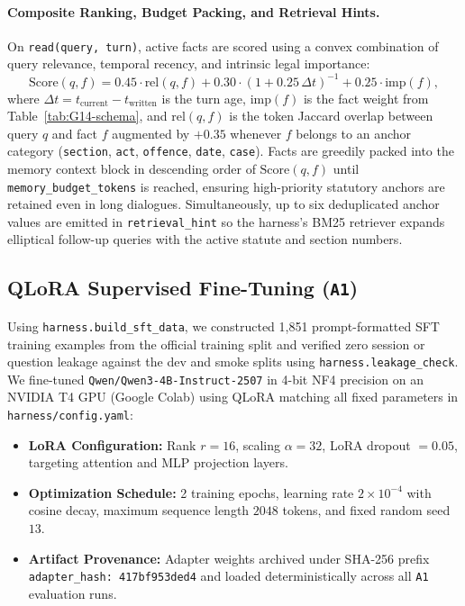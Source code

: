 \documentclass[11pt]{article}
\newcommand{\groupid}{G14}
\begin{document}
\paragraph{Composite Ranking, Budget Packing, and Retrieval Hints.}
On \texttt{read(query, turn)}, active facts are scored using a convex combination of query relevance, temporal recency, and intrinsic legal importance:
\begin{equation}
\text{Score}(q, f) = 0.45 \cdot \text{rel}(q, f) + 0.30 \cdot (1 + 0.25\,\Delta t)^{-1} + 0.25 \cdot \text{imp}(f),
\label{eq:\groupid-score}
\end{equation}
where $\Delta t = t_{\text{current}} - t_{\text{written}}$ is the turn age, $\text{imp}(f)$ is the fact weight from Table~\ref{tab:\groupid-schema}, and $\text{rel}(q, f)$ is the token Jaccard overlap between query $q$ and fact $f$ augmented by $+0.35$ whenever $f$ belongs to an anchor category (\texttt{section}, \texttt{act}, \texttt{offence}, \texttt{date}, \texttt{case}). Facts are greedily packed into the memory context block in descending order of $\text{Score}(q, f)$ until \texttt{memory\_budget\_tokens} is reached, ensuring high-priority statutory anchors are retained even in long dialogues. Simultaneously, up to six deduplicated anchor values are emitted in \texttt{retrieval\_hint} so the harness's BM25 retriever expands elliptical follow-up queries with the active statute and section numbers.

\subsection{QLoRA Supervised Fine-Tuning (\texttt{A1})}
Using \texttt{harness.build\_sft\_data}, we constructed 1,851 prompt-formatted SFT training examples from the official training split and verified zero session or question leakage against the dev and smoke splits using \texttt{harness.leakage\_check}. We fine-tuned \texttt{Qwen/Qwen3-4B-Instruct-2507} in 4-bit NF4 precision on an NVIDIA T4 GPU (Google Colab) using QLoRA matching all fixed parameters in \texttt{harness/config.yaml}:
\begin{itemize}[leftmargin=*,nosep]
    \item \textbf{LoRA Configuration:} Rank $r = 16$, scaling $\alpha = 32$, LoRA dropout $= 0.05$, targeting attention and MLP projection layers.
    \item \textbf{Optimization Schedule:} 2 training epochs, learning rate $2 \times 10^{-4}$ with cosine decay, maximum sequence length $2048$ tokens, and fixed random seed $13$.
    \item \textbf{Artifact Provenance:} Adapter weights archived under SHA-256 prefix \texttt{adapter\_hash: 417bf953ded4} and loaded deterministically across all \texttt{A1} evaluation runs.
\end{itemize}
\end{document}

